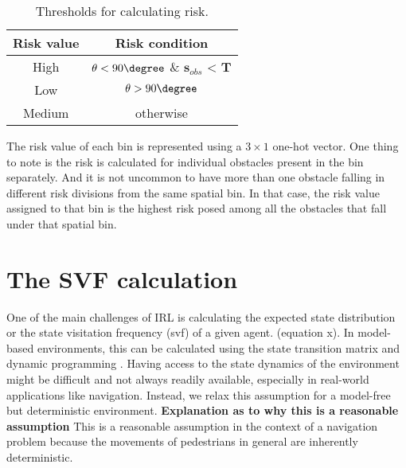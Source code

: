 \begin{table}[htbp]
	\caption{Thresholds for calculating risk.}
	\label{risk-threshold-table}
	\begin{center}
		\renewcommand{\arraystretch}{1.3}
		\begin{tabular}{|c|c|}
			\hline
			Risk value & Risk condition \\
			\hline
			High & $\theta < 90\degree$ \&  $\mathbf{s}_{obs}$ < $\mathbf{T}$   \\
			
			Low & $\theta > 90\degree$\\
			
			Medium & otherwise \\
			\hline
		\end{tabular}
	\end{center}
\end{table}
The risk value of each bin is represented using a $3 \times 1$ one-hot vector. One thing to note is the risk is calculated for individual obstacles present in the bin separately. And it is not uncommon to have more than one obstacle falling in different risk divisions from the same spatial bin. In that case, the risk value assigned to that bin is the highest risk posed among all the obstacles that fall under that spatial bin.
\begin{figure}[!htbp]
\end{figure}

\section*{The SVF calculation}
One of the main challenges of IRL is calculating the expected state distribution or the state visitation frequency (svf) of a given agent. (equation x). In model-based environments, this can be calculated using the state transition matrix and dynamic programming \cite{wulfmeier-deepirl}. Having access to the state dynamics of the environment might be difficult and not always readily available, especially in real-world applications like navigation. Instead, we relax this assumption for a model-free but deterministic environment. \textbf{Explanation as to why this is a reasonable assumption} This is a reasonable assumption in the context of a navigation problem because the movements of pedestrians in general are inherently deterministic. %

